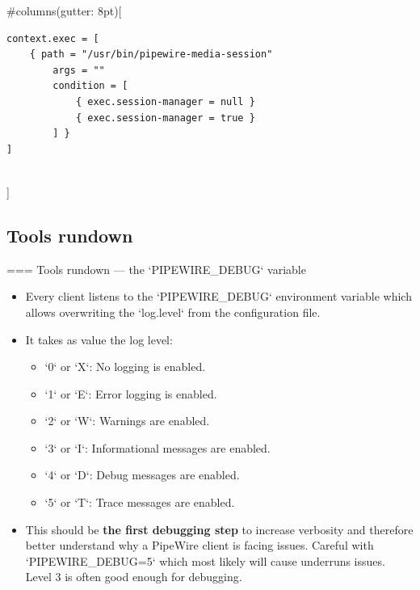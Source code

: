   
#columns(gutter: 8pt)[
    \begin{block}{}
      \fontsize{9}{9}\selectfont
        \begin{verbatim}
context.exec = [
    { path = "/usr/bin/pipewire-media-session"
        args = ""
        condition = [
            { exec.session-manager = null }
            { exec.session-manager = true }
        ] }
]
        \end{verbatim}
      \end{block}
  \\]





\subsection{Tools rundown}



=== {Tools rundown — the `PIPEWIRE_DEBUG` variable}
  \begin{itemize}

  \item Every client listens to the `PIPEWIRE_DEBUG` environment
    variable which allows overwriting the `log.level` from the
    configuration file.

  \item It takes as value the log level:

    \begin{itemize}
    \item `0` or `X`: No logging is enabled.
    \item `1` or `E`: Error logging is enabled.
    \item `2` or `W`: Warnings are enabled.
    \item `3` or `I`: Informational messages are enabled.
    \item `4` or `D`: Debug messages are enabled.
    \item `5` or `T`: Trace messages are enabled.
    \end{itemize}

  \item This should be \textbf{the first debugging step} to increase
    verbosity and therefore better understand why a PipeWire client is
    facing issues. Careful with `PIPEWIRE_DEBUG=5` which most
    likely will cause underruns issues. Level 3 is often good enough
    for debugging.

  \end{itemize}




